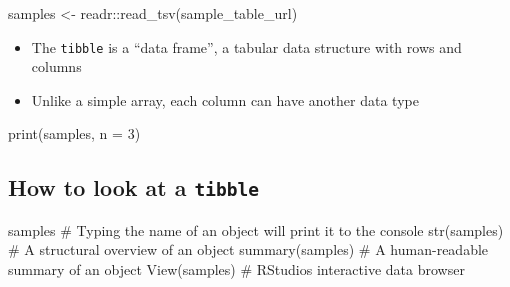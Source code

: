 \documentclass[
  letterpaper,
]{book}
\newenvironment{Shaded}{}{}
\newcommand{\AttributeTok}[1]{\textcolor[rgb]{0.84,0.23,0.29}{#1}}
\newcommand{\CommentTok}[1]{\textcolor[rgb]{0.42,0.45,0.49}{#1}}
\newcommand{\DecValTok}[1]{\textcolor[rgb]{0.00,0.36,0.77}{#1}}
\newcommand{\FunctionTok}[1]{\textcolor[rgb]{0.44,0.26,0.76}{#1}}
\newcommand{\NormalTok}[1]{\textcolor[rgb]{0.14,0.16,0.18}{#1}}
\newcommand{\OtherTok}[1]{\textcolor[rgb]{0.44,0.26,0.76}{#1}}
\newcommand{\SpecialCharTok}[1]{\textcolor[rgb]{0.00,0.36,0.77}{#1}}
\providecommand{\tightlist}{%
  \setlength{\itemsep}{0pt}\setlength{\parskip}{0pt}}\usepackage{longtable,booktabs,array}
\begin{document}
\begin{Shaded}
\begin{Highlighting}[]
\NormalTok{samples }\OtherTok{\textless{}{-}}\NormalTok{ readr}\SpecialCharTok{::}\FunctionTok{read\_tsv}\NormalTok{(sample\_table\_url)}
\end{Highlighting}
\end{Shaded}

\begin{itemize}
\tightlist
\item
  The \texttt{tibble} is a ``data frame'', a tabular data structure with
  rows and columns
\item
  Unlike a simple array, each column can have another data type
\end{itemize}

\begin{Shaded}
\begin{Highlighting}[]
\FunctionTok{print}\NormalTok{(samples, }\AttributeTok{n =} \DecValTok{3}\NormalTok{)}
\end{Highlighting}
\end{Shaded}

\hypertarget{how-to-look-at-a-tibble}{%
\subsection{\texorpdfstring{How to look at a
\texttt{tibble}}{How to look at a tibble}}\label{how-to-look-at-a-tibble}}

\begin{Shaded}
\begin{Highlighting}[]
\NormalTok{samples          }\CommentTok{\# Typing the name of an object will print it to the console}
\FunctionTok{str}\NormalTok{(samples)     }\CommentTok{\# A structural overview of an object}
\FunctionTok{summary}\NormalTok{(samples) }\CommentTok{\# A human{-}readable summary of an object}
\FunctionTok{View}\NormalTok{(samples)    }\CommentTok{\# RStudio\textquotesingle{}s interactive data browser}
\end{Highlighting}
\end{Shaded}
\end{document}
